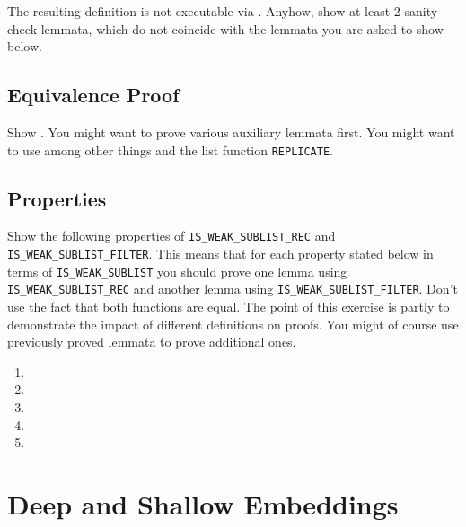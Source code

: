 \documentclass[a4paper,10pt,oneside]{scrartcl}
\begin{document}
The resulting definition is not executable via . Anyhow, show at least 2 sanity check lemmata, which do not coincide with the lemmata you are asked to show below.

\subsection{Equivalence Proof}

Show . You might want to prove various auxiliary lemmata first. You might want to use among other things  and the list function \texttt{REPLICATE}. 

\subsection{Properties}

Show the following properties of \texttt{IS\_WEAK\_SUBLIST\_REC} and \texttt{IS\_WEAK\_SUBLIST\_FILTER}. This means that for each property stated below in terms of \texttt{IS\_WEAK\_SUBLIST} you should prove one lemma using \texttt{IS\_WEAK\_SUBLIST\_REC} and another lemma using \texttt{IS\_WEAK\_SUBLIST\_FILTER}. Don't use the fact that both functions are equal. The point of this exercise is partly to demonstrate the impact of different definitions on proofs. You might of course use previously proved lemmata to prove additional ones.

\begin{enumerate}
\item {}
\item {}
\item {}
\item {}
\item {}
\end{enumerate}

\section{Deep and Shallow Embeddings}
\end{document}
